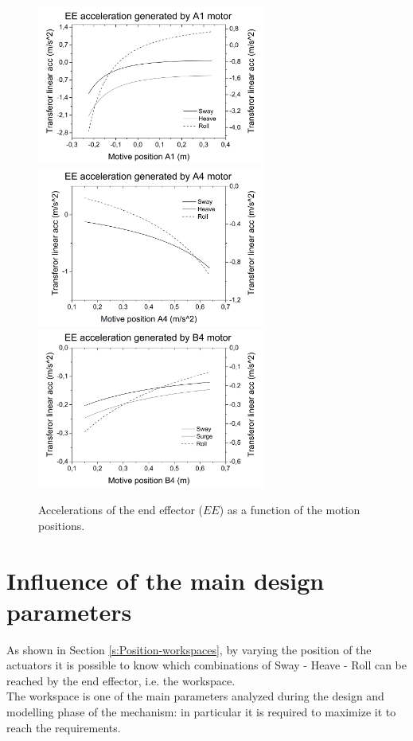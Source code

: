 \documentclass[10.5pt, twocolumn]{article}
\begin{document}
\begin{figure}[h!]
	\includegraphics[width=7.5cm]{Images/EE_acc_A1}
	\includegraphics[width=7.5cm]{Images/EE_acc_A4}
	\includegraphics[width=7.5cm]{Images/EE_acc_B4}
	\caption{Accelerations of the end effector (\( EE \)) as a function of the motion positions.}
	\label{fig:acc}
\end{figure}

\section{Influence of the main design parameters}
\label{s:Parameters}
As shown in Section \ref{s:Position-workspaces}, by varying the position of the actuators it is possible to know which combinations of Sway - Heave - Roll can be reached by the end effector, i.e. the workspace.\\
The workspace is one of the main parameters analyzed during the design and modelling phase of the mechanism: in particular it is required to maximize it to reach the requirements.
\end{document}
